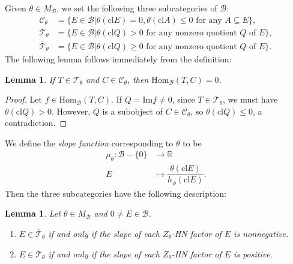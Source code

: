 \documentclass[a4paper,12pt]{amsart}
\numberwithin{equation}{section}
\newtheorem{lemma}[theorem]{Lemma}
\newcommand{\Hom}{\mathrm{Hom}}
\newcommand{\im}{\mathrm{Im}}
\newcommand{\cl}{\mathrm{cl}}
\newcommand{\1}{\mathbf{1}}
\begin{document}
Given $\theta\in M_\mathcal{B}$, we set the following three subcategories of $\mathcal{B}$:
\begin{align*}
    \mathcal{C}_\theta&=\{E\in\mathcal{B}|\theta(\cl E)=0,\theta(\cl A)\leqslant0\text{ for any }A\subseteq E\},\\
    \mathcal{T}_\theta&=\{E\in\mathcal{B}|\theta(\cl Q)>0\text{ for any nonzero quotient }Q\text{ of }E\},\\
   \overline{ \mathcal{T}}_\theta&=\{E\in\mathcal{B}|\theta(\cl Q)\geqslant0\text{ for any nonzero quotient }Q\text{ of }E\}.
\end{align*}
The following lemma follows immediately from the definition:
\begin{lemma}\label{T perp C}
    If $T\in\mathcal{T}_\theta$ and $C\in\mathcal{C}_\theta$, then $\Hom_\mathcal{B}(T,C)=0$.
\end{lemma}
\begin{proof}
    Let $f\in\Hom_\mathcal{B}(T,C)$. If $Q=\im f\neq 0$, since $T\in\mathcal{T}_\theta$, we must have $\theta(\cl Q)>0$. However, $Q$ is a subobject of $C\in\mathcal{C}_\theta$, so $\theta(\cl Q)\leqslant0$, a contradiction.
\end{proof}
We define the \emph{slope function} corresponding to $\theta$ to be
\begin{align*}
    \mu_\theta:\mathcal{B}-\{0\}&\rightarrow\mathbb{R}\\
    E&\mapsto\dfrac{\theta(\cl E)}{h_\phi(\cl E)}.
\end{align*}
Then the three subcategories have the following description:
\begin{lemma}\label{torsion part}
    Let $\theta\in M_\mathcal{B}$ and $0\neq E\in\mathcal{B}$.
    \begin{enumerate}
        \item $E\in\overline{\mathcal{T}}_\theta$ if and only if the slope of each $Z_\theta$-HN factor of $E$ is nonnegative.
        \item $E\in\mathcal{T}_\theta$ if and only if the slope of each $Z_\theta$-HN factor of $E$ is positive.
    \end{enumerate}
\end{lemma}
\end{document}

